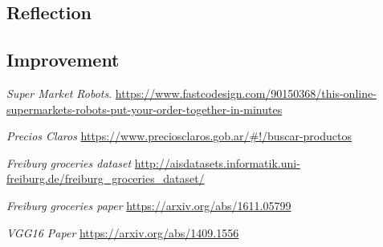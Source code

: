 \documentclass[a4paper,10pt]{article}
\begin{document}


\subsection{Reflection}



\subsection{Improvement}

	

\begin{thebibliography}{9}
\textit{Super Market Robots}. 
\url{https://www.fastcodesign.com/90150368/this-online-supermarkets-robots-put-your-order-together-in-minutes} 

\textit{Precios Claros} 
\url{https://www.preciosclaros.gob.ar/\#!/buscar-productos}
 
\textit{Freiburg groceries dataset} 
\url{http://aisdatasets.informatik.uni-freiburg.de/freiburg\_groceries\_dataset/}

\textit{Freiburg groceries paper}
\url{https://arxiv.org/abs/1611.05799} 

\textit{VGG16 Paper}
\url{https://arxiv.org/abs/1409.1556}


\end{thebibliography}
 
\end{document}
